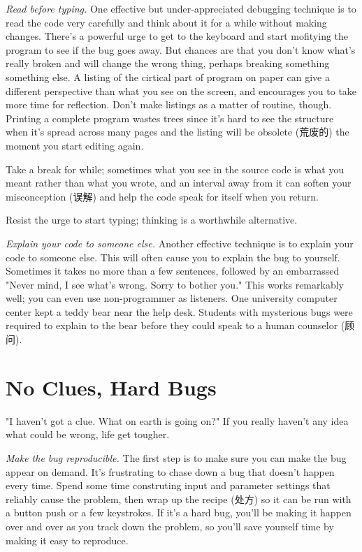 \emph{Read before typing.} One effective but under-appreciated debugging
technique is to read the code very carefully and think about it for a while
without making changes. There's a powerful urge to get to the keyboard and
start mofitying the program to see if the bug goes away. But chances are
that you don't know what's really broken and will change the wrong thing,
perhaps breaking something something else. A listing of the cirtical part
of program on paper can give a different perspective than what you see on
the screen, and encourages you to take more time for reflection. Don't make
listings as a matter of routine, though. Printing a complete program wastes
trees since it's hard to see the structure when it's spread across many
pages and the listing will be obsolete (荒废的) the moment you start
editing again.

Take a break for while; sometimes what you see in the source code is what
you meant rather than what you wrote, and an interval away from it can
soften your misconception (误解) and help the code speak for itself when
you return.

Resist the urge to start typing; thinking is a worthwhile alternative.

\emph{Explain your code to someone else.} Another effective technique is to
explain your code to someone else. This will often cause you to explain the
bug to yourself. Sometimes it takes no more than a few sentences, followed
by an embarrassed "Never mind, I see what's wrong. Sorry to bother you."
This works remarkably well; you can even use non-programmer as listeners.
One university computer center kept a teddy bear near the help desk.
Students with mysterious bugs were required to explain to the bear before
they could speak to a human counselor (顾问).

\section{No Clues, Hard Bugs}
"I haven't got a clue. What on earth is going on?" If you really haven't
any idea what could be wrong, life get tougher.

\emph{Make the bug reproducible.} The first step is to make sure you can
make the bug appear on demand. It's frustrating to chase down a bug that
doesn't happen every time. Spend some time construting input and parameter
settings that reliably cause the problem, then wrap up the recipe (处方) so
it can be run with a button push or a few keystrokes. If it's a hard bug,
you'll be making it happen over and over as you track down the problem, so
you'll save yourself time by making it easy to reproduce.

